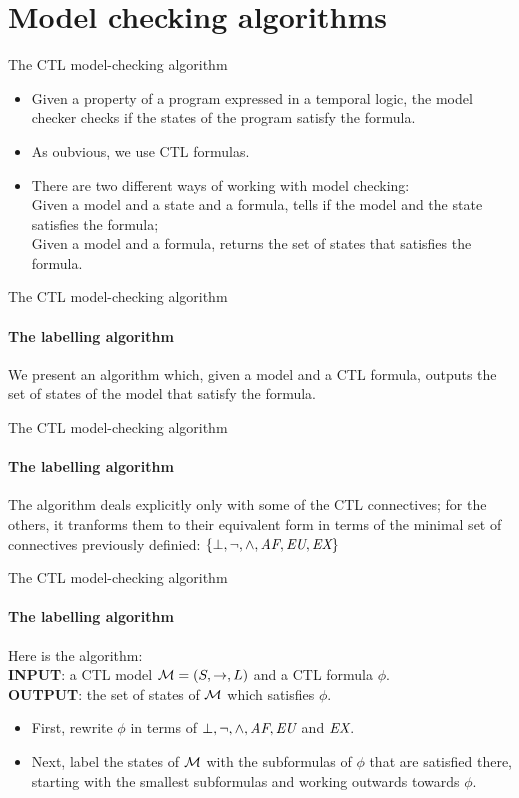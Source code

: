 \section{Model checking algorithms}

\begin{frame}{The CTL model-checking algorithm}
	\begin{itemize}
		\item
		{
			Given a property of a program expressed in a temporal logic, the model checker checks if the states of the program satisfy the formula.
			\pause
		}
		\item
		{
			As oubvious, we use CTL formulas.
			\pause
		}
		\item
		{
			There are two different ways of working with model checking:\\
			\pause
			Given a model and a state and a formula, tells if the model and the state satisfies the formula;\\
			\pause
			Given a model and a formula, returns the set of states that satisfies the formula.
		}
	\end{itemize}
\end{frame}

\begin{frame}{The CTL model-checking algorithm}
	\framesubtitle{The labelling algorithm}
	We present an algorithm which, given a model and a CTL formula, outputs the set of states of the model that satisfy the formula. 
\end{frame}

\begin{frame}{The CTL model-checking algorithm}
	\framesubtitle{The labelling algorithm}
	The algorithm deals explicitly only with some of the CTL connectives; for the others, it tranforms them to their equivalent form in terms of the minimal set of connectives previously definied: $\{\bot, \neg, \land, \textit{A}\textit{F}, \textit{E}\textit{U}, \textit{E}\textit{X} \}$ 
\end{frame}

\begin{frame}{The CTL model-checking algorithm}
	\framesubtitle{The labelling algorithm}
	Here is the algorithm:\\
	\pause
	{\bf INPUT}: a CTL model $\mathcal{M} = (S, \to, L)$ and a CTL formula $\phi$.\\
	{\bf OUTPUT}: the set of states of $\mathcal{M}$ which satisfies $\phi$.\\
	\pause
	\begin{itemize}
		\item
		{
			First, rewrite $\phi$ in terms of $\bot, \neg, \land, \textit{A}\textit{F}, \textit{E}\textit{U}$ and $\textit{E}\textit{X}$.
			\pause
		}
		\item
		{
			Next, label the states of $\mathcal{M}$ with the subformulas of $\phi$ that are satisfied there, starting with the smallest subformulas and working outwards towards $\phi$.
		}
	\end{itemize}
\end{frame}

